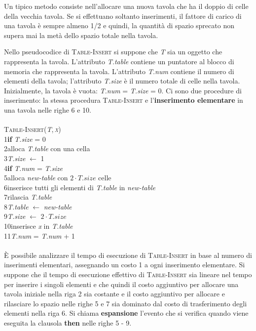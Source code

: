 \documentclass[10pt, a4paper]{report}
\newcommand\firsttab[1][0.5cm]{\hspace*{#1}}
\newcommand\secondtab[1][1cm]{\hspace*{#1}}
\begin{document}
Un tipico metodo consiste nell'allocare una nuova tavola che ha il doppio di celle della vecchia tavola. Se si effettuano soltanto inserimenti, il fattore di carico di una tavola è sempre almeno 1/2 e quindi, la quantità di spazio sprecato non supera mai la metà dello spazio totale nella tavola.

Nello pseudocodice di \textsc{Table-Insert} si suppone che \textit{T} sia un oggetto che rappresenta la tavola. L'attributo \textit{T.table} contiene un puntatore al blocco di memoria che rappresenta la tavola. L'attributo \textit{T.num} contiene il numero di elementi della tavola; l'attributo \textit{T.size} è il numero totale di celle nella tavola. Inizialmente, la tavola è vuota: \textit{T.num} = \textit{T.size} = 0. Ci sono due procedure di inserimento: la stessa procedura \textsc{Table-Insert} e l'\textbf{inserimento elementare} in una tavola nelle righe 6 e 10.\\\\
\textsc{Table-Insert(\textit{T},\,\textit{x})}\\
1\firsttab\textbf{if} \textit{T.size} = 0\\
2\secondtab alloca \textit{T.table} con una cella\\
3\secondtab\textit{T.size} $\leftarrow$ 1\\
4\firsttab\textbf{if} \textit{T.num} = \textit{T.size}\\
5\secondtab alloca \textit{new-table} con $2 \cdot T.size$ celle\\
6\secondtab inserisce tutti gli elementi di \textit{T.table} in \textit{new-table}\\
7\secondtab rilascia \textit{T.table}\\
8\secondtab\textit{T.table} $\leftarrow$ \textit{new-table}\\
9\secondtab\textit{T.size} $\leftarrow$ $2 \cdot T.size$\\
10\firsttab inserisce \textit{x} in \textit{T.table}\\
11\firsttab\textit{T.num} = \textit{T.num} + 1\\\\
È possibile analizzare il tempo di esecuzione di \textsc{Table-Insert} in base al numero di inserimenti elementari, assegnando un costo 1 a ogni inserimento elementare. Si suppone che il tempo di esecuzione effettivo di \textsc{Table-Insert} sia lineare nel tempo per inserire i singoli elementi e che quindi il costo aggiuntivo per allocare una tavola iniziale nella riga 2 sia costante e il costo aggiuntivo per allocare e rilasciare lo spazio nelle righe 5 e 7 sia dominato dal costo di trasferimento degli elementi nella riga 6. Si chiama \textbf{espansione} l'evento che si verifica quando viene eseguita la clausola \textbf{then} nelle righe 5 - 9.
\end{document}
